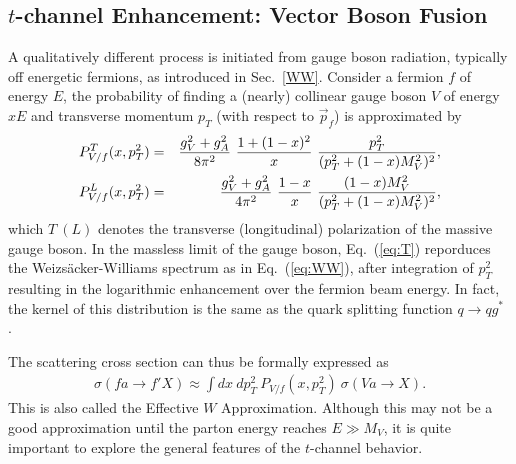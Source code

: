 \documentclass[prd,aps,floats,preprintnumbers,preprint,superscriptaddress,floatfix,nofootinbib]{revtex4}
\def\pt{p_T^{}}
\def\bea{\begin{eqnarray}}
\def\eea{\end{eqnarray}}
\begin{document}
\subsection{$t$-channel Enhancement: Vector Boson Fusion}
\label{EWA}

A qualitatively different process is initiated from gauge boson radiation,
typically off energetic fermions, as introduced in Sec.~\ref{WW}. 
Consider a fermion $f$ of energy $E$, the probability of finding a (nearly)
collinear gauge boson $V$ of energy $xE$ and transverse momentum
$\pt$ (with respect to $\vec p_f$) is approximated by \cite{sally,gordy}
\bea
\label{eq:T}
P^T_{V/f}(x,p_T^2)  &=& \frac{g_V^2+g_A^2}{ 8\pi^2}\
{ 1+(1-x)^2\over  x}\ { p_T^2\over (p_T^2+(1-x)M_V^2)^2}, \\
P^L_{V/f}(x,p_T^2) &=& \frac{g_V^2+g_A^2}{ 4\pi^2}\
{1-x\over  x}\ { (1-x)M_V^2\over (p_T^2+(1-x)M_V^2)^2},
\label{eq:L}
\eea
which $T\ (L)$ denotes the transverse (longitudinal) polarization of the
massive gauge boson. 
In the massless limit of the gauge boson, Eq.~(\ref{eq:T}) reporduces
the Weizs\"acker-Williams spectrum as in Eq.~(\ref{eq:WW}),
after integration of $p_T^2$ resulting in the logarithmic enhancement
over the fermion beam energy.  
In fact, the kernel of this distribution is the same as the quark 
splitting function $q\to qg^*$ \cite{esw,george}.

The scattering cross section can thus be formally expressed as
\bea
\sigma(f a \to f' X) \approx \int dx\ dp_T^2\ P_{V/f}(x, p_T^2)\  \sigma(V a\to X).
\label{ewa}
\eea
This is also called the Effective $W$ Approximation. Although this may
not be a good approximation until the parton energy reaches
$E\gg M_V$, it is quite important to
explore the general features of the $t$-channel behavior. 
\end{document}
